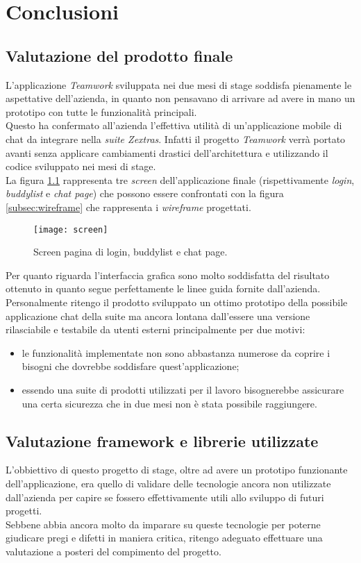 
\chapter{Conclusioni}\label{chap:conclusions}
\section{Valutazione del prodotto finale}
L’applicazione \emph{Teamwork} sviluppata nei due mesi di stage soddisfa pienamente le aspettative dell’azienda, in quanto non pensavano di arrivare ad avere in mano un prototipo con tutte le funzionalità principali. \\
Questo ha confermato all'azienda l'effettiva utilità di un'applicazione mobile di chat da integrare nella \emph{suite Zextras}. Infatti il progetto \emph{Teamwork} verrà portato avanti senza applicare cambiamenti drastici dell'architettura e utilizzando il codice sviluppato nei mesi di stage.\\
La figura \ref{sec:valutazione} rappresenta tre \emph{screen} dell'applicazione finale (rispettivamente \emph{login}, \emph{buddylist} e\emph{ chat page}) che possono essere confrontati con la figura \ref{subsec:wireframe} che rappresenta i \emph{wireframe} progettati.
\begin{figure}[H] 
	\centering
	\texttt{[image: screen]}
	\caption{Screen pagina di login, buddylist e chat page.}
	\label{sec:valutazione}
\end{figure}
Per quanto riguarda l'interfaccia grafica sono molto soddisfatta del risultato ottenuto in quanto segue perfettamente le linee guida fornite dall'azienda. \\
Personalmente ritengo il prodotto sviluppato un ottimo prototipo della possibile applicazione chat della suite ma ancora lontana dall'essere una versione rilasciabile e testabile da utenti esterni principalmente per due motivi:
\begin{itemize}
	\item le funzionalità implementate non sono abbastanza numerose da coprire i bisogni che dovrebbe soddisfare quest'applicazione;
	\item essendo una suite di prodotti utilizzati per il lavoro bisognerebbe assicurare una certa sicurezza che in due mesi non è stata possibile raggiungere.
\end{itemize}

\section{Valutazione framework e librerie utilizzate}
L'obbiettivo di questo progetto di stage, oltre ad avere un prototipo funzionante dell'applicazione, era quello di validare delle tecnologie ancora non utilizzate dall'azienda per capire se fossero effettivamente utili allo sviluppo di futuri progetti. \\
Sebbene abbia ancora molto da imparare su queste tecnologie per poterne giudicare pregi e difetti in maniera critica, ritengo adeguato effettuare una valutazione a posteri del compimento del progetto.
